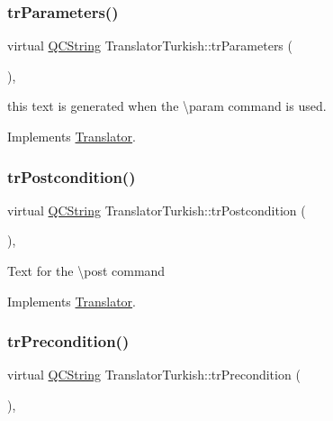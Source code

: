 \subsubsection{\texorpdfstring{trParameters()}{trParameters()}}
{\footnotesize\ttfamily virtual \mbox{\hyperlink{class_q_c_string}{Q\+C\+String}} Translator\+Turkish\+::tr\+Parameters (\begin{DoxyParamCaption}{ }\end{DoxyParamCaption})\hspace{0.3cm}{\ttfamily [inline]}, {\ttfamily [virtual]}}

this text is generated when the \textbackslash{}param command is used. 

Implements \mbox{\hyperlink{class_translator}{Translator}}.

\mbox{\label{class_translator_turkish_a3b7f88e0c2ca6df04ad206ee0a6c0b07}} 
\subsubsection{\texorpdfstring{trPostcondition()}{trPostcondition()}}
{\footnotesize\ttfamily virtual \mbox{\hyperlink{class_q_c_string}{Q\+C\+String}} Translator\+Turkish\+::tr\+Postcondition (\begin{DoxyParamCaption}{ }\end{DoxyParamCaption})\hspace{0.3cm}{\ttfamily [inline]}, {\ttfamily [virtual]}}

Text for the \textbackslash{}post command 

Implements \mbox{\hyperlink{class_translator}{Translator}}.

\mbox{\label{class_translator_turkish_a6c47fb3d50548bfb6e1ee5bfa0e50696}} 
\subsubsection{\texorpdfstring{trPrecondition()}{trPrecondition()}}
{\footnotesize\ttfamily virtual \mbox{\hyperlink{class_q_c_string}{Q\+C\+String}} Translator\+Turkish\+::tr\+Precondition (\begin{DoxyParamCaption}{ }\end{DoxyParamCaption})\hspace{0.3cm}{\ttfamily [inline]}, {\ttfamily [virtual]}}

